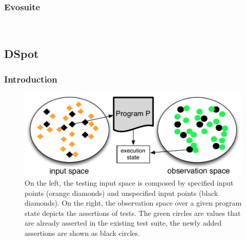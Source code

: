 \documentclass[11pt]{sdm}
\newcommand{\todo}[1]{\colorbox{Red!75}{\textcolor{white}{\textbf{TODO\ifx&#1&\else: #1\fi}}}}
\begin{document}
\subsubsection{Evosuite}
\label{evosuite}
\cite{fraser2011evosuite}
\todo{}


\subsection{DSpot}
\label{testsuite_eval}

\subsubsection{Introduction}
\begin{figure}
  \centering
  \includegraphics[scale=0.5]{io-spaces.pdf}
  \caption{On the left, the testing input space is composed by specified input points (orange diamonds) and unspecified input points (black diamonds). On the right, the observation space over a given program state depicts the assertions of tests. The green circles are values that are already asserted in the existing test suite, the newly added assertions are shown as black circles.}
\label{fig:io-spaces}
\end{figure}
\end{document}
